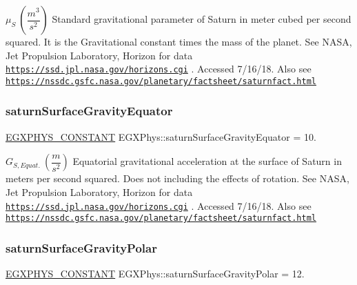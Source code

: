 $ \mu_{S} \ (\dfrac{m^3}{s^2})$ Standard gravitational parameter of Saturn in meter cubed per second squared. It is the Gravitational constant times the mass of the planet. See N\+A\+SA, Jet Propulsion Laboratory, Horizon for data \href{https://ssd.jpl.nasa.gov/horizons.cgi}{\tt https\+://ssd.\+jpl.\+nasa.\+gov/horizons.\+cgi} . Accessed 7/16/18. Also see \href{https://nssdc.gsfc.nasa.gov/planetary/factsheet/saturnfact.html}{\tt https\+://nssdc.\+gsfc.\+nasa.\+gov/planetary/factsheet/saturnfact.\+html} \mbox{\label{group___e_g_x_phys-_constants-_astrophysics-_solar_system-_saturn-_bulk_gaadcbb6c11874c32eae697d97ed52dd93}} 
\subsubsection{\texorpdfstring{saturn\+Surface\+Gravity\+Equator}{saturnSurfaceGravityEquator}}
{\footnotesize\ttfamily \mbox{\hyperlink{group___e_g_x_phys-_constants-_macros_ga76980d288494ce1714c9ac68a95ba702}{E\+G\+X\+P\+H\+Y\+S\+\_\+\+C\+O\+N\+S\+T\+A\+NT}} E\+G\+X\+Phys\+::saturn\+Surface\+Gravity\+Equator = 10.}

$ G_{S,Equat.} \ (\dfrac{m}{s^2})$ Equatorial gravitational acceleration at the surface of Saturn in meters per second squared. Does not including the effects of rotation. See N\+A\+SA, Jet Propulsion Laboratory, Horizon for data \href{https://ssd.jpl.nasa.gov/horizons.cgi}{\tt https\+://ssd.\+jpl.\+nasa.\+gov/horizons.\+cgi} . Accessed 7/16/18. Also see \href{https://nssdc.gsfc.nasa.gov/planetary/factsheet/saturnfact.html}{\tt https\+://nssdc.\+gsfc.\+nasa.\+gov/planetary/factsheet/saturnfact.\+html} \mbox{\label{group___e_g_x_phys-_constants-_astrophysics-_solar_system-_saturn-_bulk_ga3b5fcd3fd6c84085b5360b3a6b54ae5f}} 
\subsubsection{\texorpdfstring{saturn\+Surface\+Gravity\+Polar}{saturnSurfaceGravityPolar}}
{\footnotesize\ttfamily \mbox{\hyperlink{group___e_g_x_phys-_constants-_macros_ga76980d288494ce1714c9ac68a95ba702}{E\+G\+X\+P\+H\+Y\+S\+\_\+\+C\+O\+N\+S\+T\+A\+NT}} E\+G\+X\+Phys\+::saturn\+Surface\+Gravity\+Polar = 12.}

